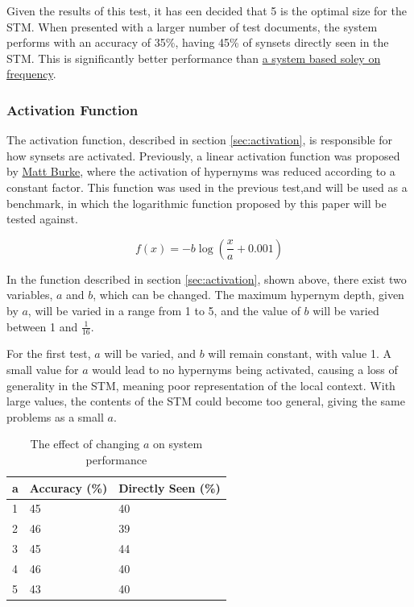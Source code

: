 \documentclass[]{article}
\begin{document}
Given the results of this test, it has een decided that 5 is the optimal size for the STM. When presented with a larger number of test documents, the system performs with an accuracy of 35\%, having 45\% of synsets directly seen in the STM. This is significantly better performance than \hyperref[sec:EvFrequency]{ a system based soley on frequency}.

\subsubsection{Activation Function}
\label{sec:EvActivation}
The activation function, described in section \ref{sec:activation}, is responsible for how synsets are activated. Previously, a linear activation function was proposed by \hyperref[sec:MattBurke]{Matt Burke}, where the activation of hypernyms was reduced according to a constant factor. This function was used in the previous test,and will be used as a benchmark, in which the logarithmic function proposed by this paper will be tested against. 

\[f(x) = -b\log(\frac{x}{a}+0.001)\]

In the function described in section \ref{sec:activation}, shown above, there exist two variables, $a$ and $b$, which can be changed. The maximum hypernym depth, given by $a$, will be varied in a range from 1 to 5, and the value of $b$ will be varied between 1 and $\frac{1}{16}$.

For the first test, $a$ will be varied, and $b$ will remain constant, with value 1. A small value for $a$ would lead to no hypernyms being activated, causing a loss of generality in the STM, meaning poor representation of the local context. With large values, the contents of the STM could become too general, giving the same problems as a small $a$.

\begin{table}
\begin{center}
\begin{tabular}{|p{2em}|p{7em}|p{7em}|}
	\hline
	a & Accuracy (\%) & Directly Seen (\%) \\
	\hline
	1 & 45 & 40\\
	\hline
	2 & 46 & 39\\
	\hline
	3 & 45 & 44\\
	\hline
	4 & 46 & 40\\
	\hline
	5 & 43 & 40\\
	\hline
\end{tabular}
\end{center}
\caption{The effect of changing $a$ on system performance}
\label{table:aActivation}
\end{table}
\end{document}

